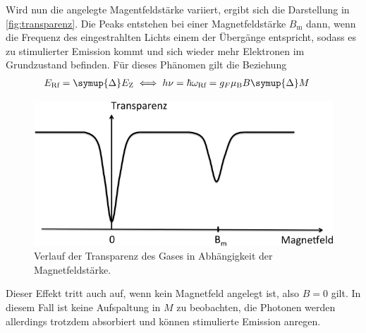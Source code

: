     Wird nun die angelegte Magentfeldstärke variiert,
    ergibt sich die Darstellung in \autoref{fig:transparenz}.
    Die Peaks entstehen bei einer Magnetfeldstärke $B_\text{m}$ dann,
    wenn die Frequenz des eingestrahlten Lichts einem der Übergänge entspricht,
    sodass es zu stimulierter Emission kommt und sich wieder mehr Elektronen im Grundzustand befinden.
    Für dieses Phänomen gilt die Beziehung
    \begin{align}
        E_\text{Rf} = \symup{\Delta} E_\text{Z} & \iff h \nu = \hbar \omega_\text{Rf} = g_F \mu_\text{B} B \symup{\Delta} M
        \
    \end{align}
    \begin{figure}
        \centering
        \includegraphics[scale=0.5]{content/img/Abb_2.png}
        \caption{Verlauf der Transparenz des Gases in Abhängigkeit der Magnetfeldstärke. \cite{versuchsanleitung}}
        \label{fig:transparenz}
    \end{figure}

    Dieser Effekt tritt auch auf,
    wenn kein Magnetfeld angelegt ist,
    also $B = 0$ gilt.
    In diesem Fall ist keine Aufspaltung in $M$ zu beobachten,
    die Photonen werden allerdings trotzdem absorbiert und können stimulierte Emission anregen.











